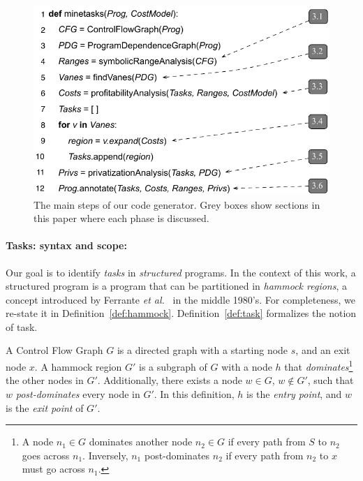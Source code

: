 \documentclass[sigplan,10pt,screen]{acmart}
\begin{document}
\begin{figure}[b]
\begin{center}
\includegraphics[width=1\columnwidth]{images/alg_main}
\caption{The main steps of our code generator.
Grey boxes show sections in this paper where each phase is discussed.}
\label{fig:alg_main}
\end{center}
\end{figure}

\paragraph{Tasks: syntax and scope:}
Our goal is to identify {\em tasks} in {\em structured} programs.
In the context of this work, a structured program is a program that can be
partitioned in {\em hammock regions}, a concept introduced by Ferrante
{\em et al.}~\cite{Ferrante87} in the middle 1980's.
For completeness, we re-state it in Definition~\ref{def:hammock}.
Definition~\ref{def:task} formalizes the notion of task.

\begin{definition}
\label{def:hammock}
A Control Flow Graph $G$ is a directed graph with a starting node $s$, and an
exit node $x$.
A hammock region $G'$ is a subgraph of $G$ with a node $h$ that
{\em dominates}\footnote{A node $n_1 \in G$ dominates another node
$n_2 \in G$ if every path from  $S$ to $n_2$ goes across $n_1$.
Inversely, $n_1$ post-dominates $n_2$ if every path from $n_2$ to $x$ must
go across $n_1$.} the other nodes in $G'$.
Additionally, there exists a node $w \in G$, $w \notin G'$, such that
$w$ {\em post-dominates} every node in $G'$.
In this definition, $h$ is the {\em entry point}, and $w$ is the {\em exit point}
of $G'$.
\end{definition}
\end{document}
